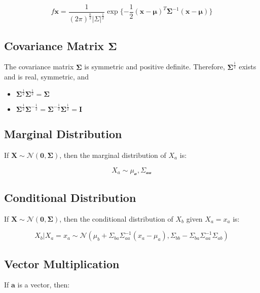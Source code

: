 \begin{equation}
f{\mathbf{x}} = \frac{1}{(2\pi)^{\frac{k}{2}}|\Sigma|^{\frac{1}{2}}}\exp\{-\frac{1}{2}(\mathbf{x}-\mathbf{\mu})^T \mathbf{\Sigma}^{-1}(\mathbf{x}-\mathbf{\mu})\}
\end{equation}



\subsection{Covariance Matrix $\mathbf{\Sigma}$}
The covariance matrix $\mathbf{\Sigma}$ is symmetric and positive definite. Therefore, $\mathbf{\Sigma}^{\frac{1}{2}}$ exists and is real, symmetric, and

\begin{itemize}
\item $\mathbf{\Sigma}^{\frac{1}{2}}\mathbf{\Sigma}^{\frac{1}{2}} = \mathbf{\Sigma}$
\item $\mathbf{\Sigma}^{\frac{1}{2}}\mathbf{\Sigma}^{-\frac{1}{2}}=\mathbf{\Sigma}^{-\frac{1}{2}}\mathbf{\Sigma}^{\frac{1}{2}}=\mathbf{I}$
\end{itemize}


\subsection{Marginal Distribution}
If $\mathbf{X} \sim \mathscr{N}(\mathbf{0},\mathbf{\Sigma})$, then the marginal distribution of $X_a$ is:

\begin{equation}
X_a \sim \mathscr{\mu_a,\Sigma_{aa}}
\end{equation}


\subsection{Conditional Distribution}
If $\mathbf{X} \sim \mathscr{N}(\mathbf{0},\mathbf{\Sigma})$, then the conditional distribution of $X_b$ given $X_a = x_a$ is:

\begin{equation}
X_b|X_a = x_a \sim \mathscr{N}(\mu_b + \Sigma_{ba}\Sigma_{aa}^{-1}(x_a - \mu_a), \Sigma_{bb}-\Sigma_{ba}\Sigma_{aa}^{-1}\Sigma_{ab}) 
\end{equation}


\subsection{Vector Multiplication}
If $\mathbf{a}$ is a vector, then:

